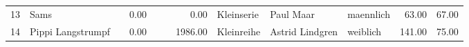 \begin{table}
\begin{center}
{\begin{tabular}{rllrllrlllrr}
  13 & Sams                                                                                                                                                                                                                                                            &                                                                                                                                                                                                                                                                 & 0.00 &                                                                                                                                                                                                                                                                 &                                                                                                                                                                                                                                                                 & 0.00 & Kleinserie & Paul Maar                                                                                                                                                                                                                                                       & maennlich & 63.00 & 67.00 \\ 
  14 & Pippi Langstrumpf                                                                                                                                                                                                                                               &                                                                                                                                                                                                                                                                 & 0.00 &                                                                                                                                                                                                                                                                 &                                                                                                                                                                                                                                                                 & 1986.00 & Kleinreihe & Astrid Lindgren                                                                                                                                                                                                                                                 & weiblich & 141.00 & 75.00 \\ 

\end{tabular}}
\end{center}
\end{table}
